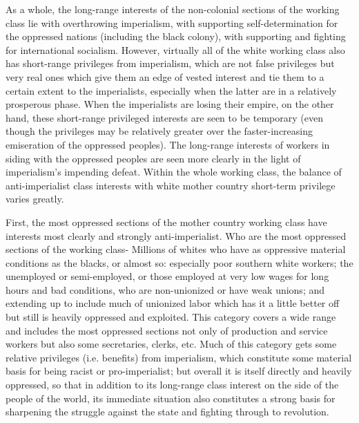 \documentclass[12pt, titlepage]{article}
\begin{document}
{\begin{spacing}{1.10}
As a whole, the long-range interests of the non-colonial sections of the working class lie with overthrowing imperialism, with supporting self-determination for the oppressed nations (including the black colony), with supporting and fighting for international socialism. However, virtually all of the white working class also has short-range privileges from imperialism, which are not false privileges but very real ones which give them an edge of vested interest and tie them to a certain extent to the imperialists, especially when the latter are in a relatively prosperous phase. When the imperialists are losing their empire, on the other hand, these short-range privileged interests are seen to be temporary (even though the privileges may be relatively greater over the faster-increasing emiseration of the oppressed peoples). The long-range interests of workers in siding with the oppressed peoples are seen more clearly in the light of imperialism's impending defeat. Within the whole working class, the balance of anti-imperialist class interests with white mother country short-term privilege varies greatly.

First, the most oppressed sections of the mother country working class have interests most clearly and strongly anti-imperialist. Who are the most oppressed sections of the working class- Millions of whites who have as oppressive material conditions as the blacks, or almost so: especially poor southern white workers; the unemployed or semi-employed, or those employed at very low wages for long hours and bad conditions, who are non-unionized or have weak unions; and extending up to include much of unionized labor which has it a little better off but still is heavily oppressed and exploited. This category covers a wide range and includes the most oppressed sections not only of production and service workers but also some secretaries, clerks, etc. Much of this category gets some relative privileges (i.e. benefits) from imperialism, which constitute some material basis for being racist or pro-imperialist; but overall it is itself directly and heavily oppressed, so that in addition to its long-range class interest on the side of the people of the world, its immediate situation also constitutes a strong basis for sharpening the struggle against the state and fighting through to revolution.


\end{spacing}}
\end{document}
